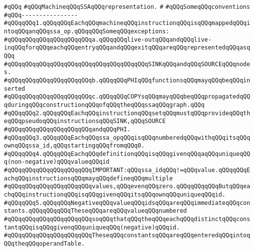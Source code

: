 \label{src/lib/compiler/back/low/static-single-assignment/ssa.api}
\verb|#qQQq|\newline
\verb|#qQQqMachineqQQqSSAqQQqrepresentation.|\newline
\verb|#|\newline
\verb|#qQQqSomeqQQqconventions|\newline
\verb|#qQQq----------------|\newline
\verb|#qQQqqQQq1.qQQqqQQqEachqQQqmachineqQQqinstructionqQQqisqQQqmappedqQQqintoqQQqanqQQqssa_op.qQQqqQQqSomeqQQqexceptions:|\newline
\verb|#qQQqqQQqqQQqqQQqqQQqqQQqa.qQQqqQQqlive-outqQQqandqQQqlive-inqQQqforqQQqeachqQQqentryqQQqandqQQqexitqQQqareqQQqrepresentedqQQqasqQQq|\newline
\verb|#qQQqqQQqqQQqqQQqqQQqqQQqqQQqqQQqqQQqqQQqSINKqQQqandqQQqSOURCEqQQqnodes.|\newline
\verb|#qQQqqQQqqQQqqQQqqQQqqQQqb.qQQqqQQqPHIqQQqfunctionsqQQqmayqQQqbeqQQqinserted|\newline
\verb|#qQQqqQQqqQQqqQQqqQQqqQQqc.qQQqqQQqCOPYsqQQqmayqQQqbeqQQqpropagatedqQQqduringqQQqconstructionqQQqofqQQqtheqQQqssaqQQqgraph.qQQq|\newline
\verb|#qQQqqQQq2.qQQqqQQqEachqQQqinstructionqQQqsetqQQqmustqQQqprovideqQQqtheqQQqpseudoqQQqinstructionsqQQqSINK,qQQqSOURCE|\newline
\verb|#qQQqqQQqqQQqqQQqqQQqqQQqandqQQqPHI.|\newline
\verb|#qQQqqQQq3.qQQqqQQqEachqQQqssa_opqQQqisqQQqnumberedqQQqwithqQQqitsqQQqownqQQqssa_id,qQQqstartingqQQqfromqQQq0.|\newline
\verb|#qQQqqQQq4.qQQqqQQqEachqQQqdefinitionqQQqisqQQqgivenqQQqaqQQquniqueqQQq(non-negative)qQQqvalueqQQqid|\newline
\verb|#qQQqqQQqqQQqqQQqqQQqqQQqIMPORTANT:qQQqssa_idqQQq!=qQQqvalue.qQQqqQQqEachqQQqinstructionsqQQqmayqQQqdefineqQQqmultiple|\newline
\verb|#qQQqqQQqqQQqqQQqqQQqqQQqvalues,qQQqevenqQQqzero.qQQqqQQqqQQqButqQQqeachqQQqinstructionqQQqisqQQqgivenqQQqitsqQQqownqQQquniqueqQQqid.|\newline
\verb|#qQQqqQQq5.qQQqqQQqNegativeqQQqvalueqQQqidsqQQqareqQQqimmediateqQQqconstants.qQQqqQQqqQQqTheseqQQqareqQQqvalueqQQqnumbered|\newline
\verb|#qQQqqQQqqQQqqQQqqQQqqQQqsoqQQqthatqQQqtheqQQqeachqQQqdistinctqQQqconstantqQQqisqQQqgivenqQQquniqueqQQq(negative)qQQqid.|\newline
\verb|#qQQqqQQqqQQqqQQqqQQqqQQqTheseqQQqconstantsqQQqareqQQqenteredqQQqintoqQQqtheqQQqoperandTable.|\newline
